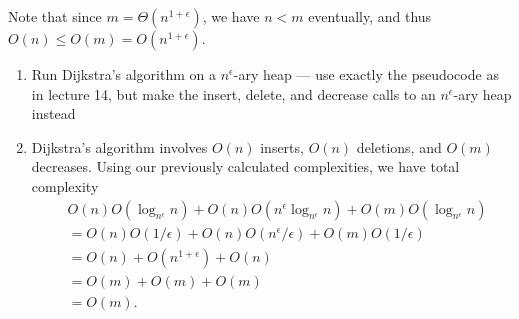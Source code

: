 \documentclass[12 pt, letterpaper]{hmcpset}
\begin{document}
\begin{solution}
	Note that since $m = \Theta(n^{1 + \epsilon})$, we have $n < m$ eventually, and thus $O(n) \le O(m) = O(n^{1 + \epsilon})$.
	\begin{enumerate}
		\item[(d)] Run Dijkstra's algorithm on a $n^{\epsilon}$-ary heap --- use exactly the pseudocode as in lecture 14, but make the insert, delete, and decrease calls to an $n^{\epsilon}$-ary heap instead

		\item[(e)] Dijkstra's algorithm involves $O(n)$ inserts, $O(n)$ deletions, and $O(m)$ decreases. Using our previously calculated complexities, we have total complexity
			\begin{align*}
				& O(n) O(\log_{n^{\epsilon}} n) + O(n) O(n^{\epsilon} \log_{n^\epsilon} n) + O(m) O(\log_{n^{\epsilon}} n)  \\
				& = O(n) O(1 / \epsilon) + O(n) O(n^{\epsilon} / \epsilon) + O(m) O(1 / \epsilon) \\
				& = O(n) + O(n^{1 + \epsilon}) + O(n) \\
				& = O(m) + O(m) + O(m) \\
				& = O(m).
			\end{align*}
	\end{enumerate}
\end{solution}

\pagebreak
\end{document}

